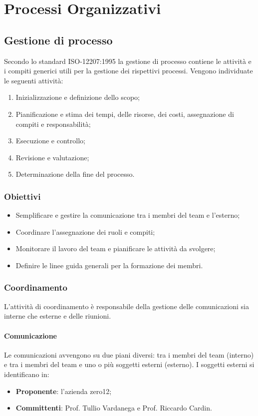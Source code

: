 \section{Processi Organizzativi}
\subsection{Gestione di processo}
Secondo lo standard ISO-12207:1995 la gestione di processo contiene le attività e i compiti generici utili per la gestione dei rispettivi processi. Vengono individuate le seguenti attività:
\begin{enumerate}
\item Inizializzazione e definizione dello scopo;
\item Pianificazione e stima dei tempi, delle risorse, dei costi, assegnazione di compiti e responsabilità;
\item Esecuzione e controllo;
\item Revisione e valutazione;
\item Determinazione della fine del processo.
\end{enumerate}

\subsubsection{Obiettivi}
\begin{itemize}
\item Semplificare e gestire la comunicazione tra i membri del team e l'esterno;
\item Coordinare l'assegnazione dei ruoli e compiti;
\item Monitorare il lavoro del team e pianificare le attività da svolgere;
\item Definire le linee guida generali per la formazione dei membri.
\end{itemize}

\subsubsection{Coordinamento}
L'attività di coordinamento è responsabile della gestione delle comunicazioni sia interne che esterne e delle riunioni.


\paragraph{Comunicazione}
Le comunicazioni avvengono su due piani diversi: tra i membri del team (interno) e tra i membri del team e uno o più soggetti esterni (esterno). I soggetti esterni si identificano in:
\begin{itemize}
\item \textbf{Proponente}: l'azienda zero12;
\item \textbf{Committenti}:  Prof. Tullio Vardanega e Prof. Riccardo Cardin.
\end{itemize}

